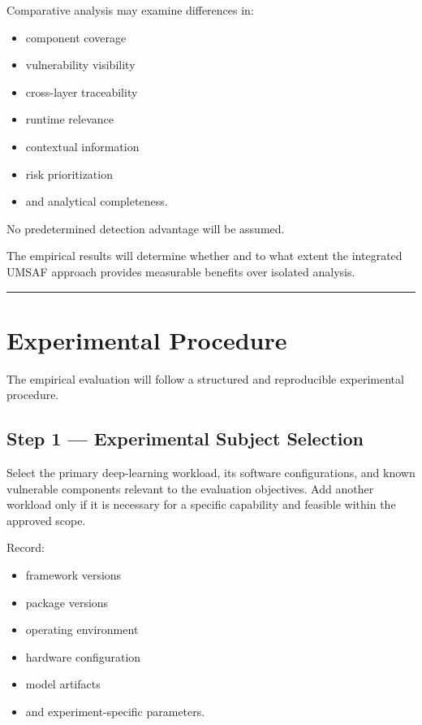 \documentclass[
  12pt,
  letterpaper,
  oneside]{report}
\providecommand{\tightlist}{%
  \setlength{\itemsep}{0pt}\setlength{\parskip}{0pt}}
\begin{document}
Comparative analysis may examine differences in:

\begin{itemize}
\tightlist
\item
  component coverage
\item
  vulnerability visibility
\item
  cross-layer traceability
\item
  runtime relevance
\item
  contextual information
\item
  risk prioritization
\item
  and analytical completeness.
\end{itemize}

No predetermined detection advantage will be assumed.

The empirical results will determine whether and to what extent the
integrated UMSAF approach provides measurable benefits over isolated
analysis.

\begin{center}\rule{0.5\linewidth}{0.5pt}\end{center}

\section{Experimental Procedure}\label{117-experimental-procedure}

The empirical evaluation will follow a structured and reproducible
experimental procedure.

\subsection{Step 1 --- Experimental Subject
Selection}\label{step-1--experimental-subject-selection}

Select the primary deep-learning workload, its software configurations,
and known vulnerable components relevant to the evaluation objectives.
Add another workload only if it is necessary for a specific capability
and feasible within the approved scope.

Record:

\begin{itemize}
\tightlist
\item
  framework versions
\item
  package versions
\item
  operating environment
\item
  hardware configuration
\item
  model artifacts
\item
  and experiment-specific parameters.
\end{itemize}
\end{document}
